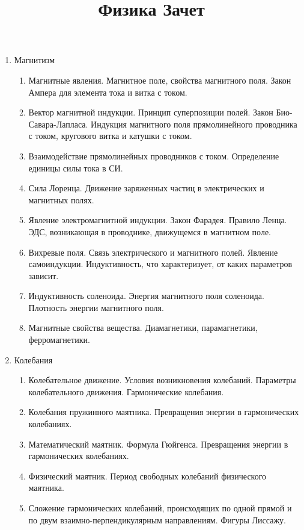 \documentclass{article}
\title{Физика Зачет}
\begin{document}
\maketitle

\begin{enumerate}
    \item Магнитизм
    \begin{enumerate}
        \item Магнитные явления. Магнитное поле, свойства магнитного поля.  Закон Ампера для элемента тока и витка с током.
        \item Вектор магнитной индукции. Принцип суперпозиции полей. Закон Био-Савара-Лапласа. Индукция магнитного поля прямолинейного проводника с током, кругового витка и катушки с током.
        \item Взаимодействие прямолинейных проводников с током. Определение единицы силы тока в СИ.
        \item Сила Лоренца. Движение заряженных частиц в электрических и магнитных полях.
        \item Явление электромагнитной индукции. Закон Фарадея. Правило Ленца. ЭДС, возникающая в проводнике, движущемся в магнитном поле.
        \item Вихревые поля. Связь электрического и магнитного полей. Явление самоиндукции. Индуктивность, что характеризует, от каких параметров зависит.
        \item Индуктивность соленоида. Энергия магнитного поля соленоида. Плотность энергии магнитного поля.
        \item Магнитные свойства вещества. Диамагнетики, парамагнетики, ферромагнетики.
    \end{enumerate}
    \item Колебания
    \begin{enumerate}
        \item Колебательное движение. Условия возникновения колебаний. Параметры колебательного движения. Гармонические колебания.
        \item Колебания пружинного маятника. Превращения энергии в гармонических колебаниях.
        \item Математический маятник. Формула Гюйгенса. Превращения энергии в гармонических колебаниях.
        \item Физический маятник. Период свободных колебаний физического маятника.
        \item Сложение гармонических колебаний, происходящих по одной прямой и по двум взаимно-перпендикулярным направлениям. Фигуры Лиссажу.

\end{enumerate}
\end{enumerate}
\end{document}
